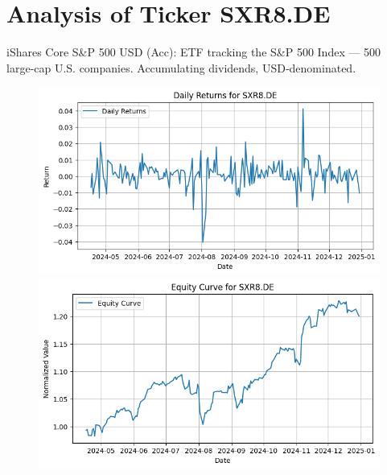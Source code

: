 \documentclass{article}%
\begin{document}
%
\newpage

%
\section*{Analysis of Ticker SXR8.DE}%
\label{sec:AnalysisofTickerSXR8.DE}%
iShares Core S\&P 500 USD (Acc): ETF tracking the S\&P 500 Index — 500 large‑cap U.S. companies. Accumulating dividends, USD‑denominated.%


\begin{figure}[htbp]%
\begin{minipage}{0.49\textwidth}%
\includegraphics[width=\linewidth]{ticker_images/SXR8.DE_daily_returns.png}%
\end{minipage}%
\begin{minipage}{0.49\textwidth}%
\includegraphics[width=\linewidth]{ticker_images/SXR8.DE_equity_curve.png}%
\end{minipage}%
\end{figure}

%
\end{document}
